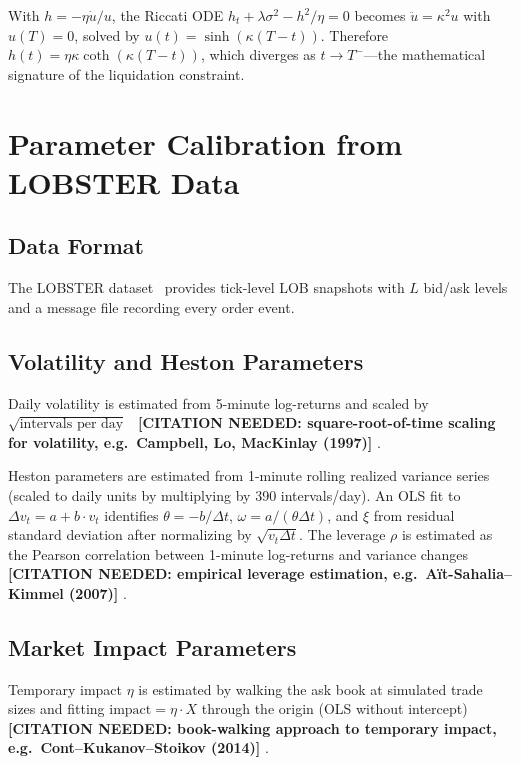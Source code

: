 \documentclass[11pt]{article}
\newcommand{\needscite}[1]{%
  {\color{red}\textbf{[CITATION NEEDED: #1]}}%
}
\begin{document}
With $h = -\eta\dot{u}/u$, the Riccati ODE $h_t + \lambda\sigma^2 - h^2/\eta = 0$ becomes
$\ddot{u} = \kappa^2 u$ with $u(T) = 0$, solved by $u(t) = \sinh(\kappa(T-t))$.
Therefore $h(t) = \eta\kappa\coth(\kappa(T-t))$, which diverges as $t\to T^-$---the
mathematical signature of the liquidation constraint.

\section{Parameter Calibration from LOBSTER Data}
\label{app:calibration}

\subsection{Data Format}

The LOBSTER dataset~\cite{huang2011lobster} provides tick-level LOB snapshots with $L$ bid/ask
levels and a message file recording every order event.

\subsection{Volatility and Heston Parameters}

Daily volatility is estimated from 5-minute log-returns and scaled by
$\sqrt{\text{intervals per day}}$~\needscite{square-root-of-time scaling for volatility, e.g.\ Campbell, Lo, MacKinlay (1997)}.

Heston parameters are estimated from 1-minute rolling realized variance series (scaled to
daily units by multiplying by 390 intervals/day).
An OLS fit to $\Delta v_t = a + b\cdot v_t$ identifies $\theta = -b/\Delta t$,
$\omega = a/(\theta\Delta t)$, and $\xi$ from residual standard deviation after
normalizing by $\sqrt{v_t\Delta t}$.
The leverage $\rho$ is estimated as the Pearson correlation between 1-minute
log-returns and variance changes~\needscite{empirical leverage estimation, e.g.\ Aït-Sahalia--Kimmel (2007)}.

\subsection{Market Impact Parameters}

Temporary impact $\eta$ is estimated by walking the ask book at simulated trade sizes and
fitting $\text{impact} = \eta\cdot X$ through the origin
(OLS without intercept)~\needscite{book-walking approach to temporary impact, e.g.\ Cont--Kukanov--Stoikov (2014)}.
\end{document}
